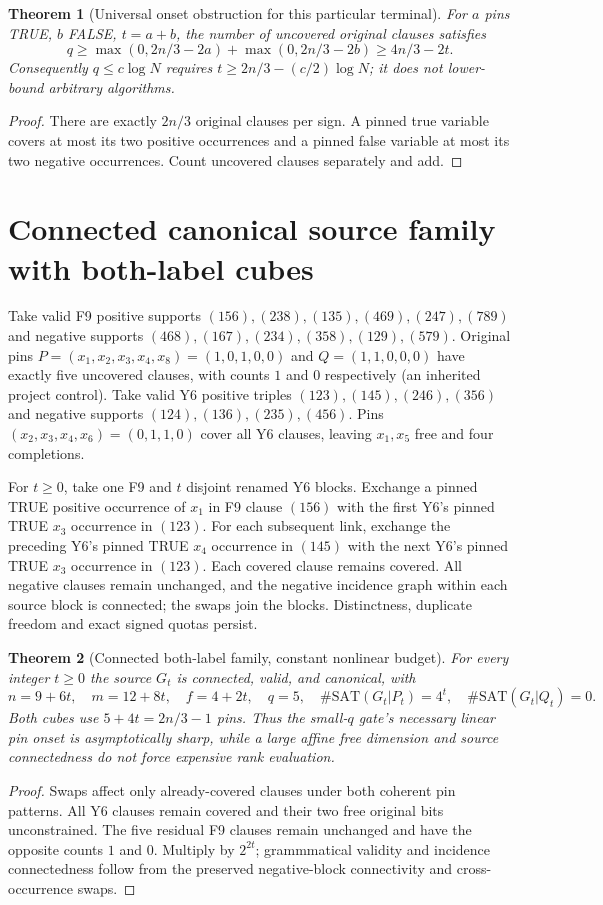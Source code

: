 \documentclass[11pt]{article}
\newtheorem{theorem}{Theorem}
\begin{document}
\begin{theorem}[Universal onset obstruction for this particular terminal]
For $a$ pins TRUE, $b$ FALSE, $t=a+b$, the number of uncovered original clauses satisfies
\[
\boxed{q\ge\max(0,2n/3-2a)+\max(0,2n/3-2b)\ge4n/3-2t.}
\tag{305.2}
\]
Consequently $q\le c\log N$ requires $t\ge2n/3-(c/2)\log N$; it does not lower-bound arbitrary algorithms.
\end{theorem}
\begin{proof}
There are exactly $2n/3$ original clauses per sign. A pinned true variable covers at most its two positive occurrences and a pinned false variable at most its two negative occurrences. Count uncovered clauses separately and add.
\end{proof}

\section{Connected canonical source family with both-label cubes}
Take valid F9 positive supports $(156),(238),(135),(469),(247),(789)$ and negative supports $(468),(167),(234),(358),(129),(579)$. Original pins $P=(x_1,x_2,x_3,x_4,x_8)=(1,0,1,0,0)$ and $Q=(1,1,0,0,0)$ have exactly five uncovered clauses, with counts $1$ and $0$ respectively (an inherited project control). Take valid Y6 positive triples $(123),(145),(246),(356)$ and negative supports $(124),(136),(235),(456)$. Pins $(x_2,x_3,x_4,x_6)=(0,1,1,0)$ cover all Y6 clauses, leaving $x_1,x_5$ free and four completions.

For $t\ge0$, take one F9 and $t$ disjoint renamed Y6 blocks. Exchange a pinned TRUE positive occurrence of $x_1$ in F9 clause $(156)$ with the first Y6's pinned TRUE $x_3$ occurrence in $(123)$. For each subsequent link, exchange the preceding Y6's pinned TRUE $x_4$ occurrence in $(145)$ with the next Y6's pinned TRUE $x_3$ occurrence in $(123)$. Each covered clause remains covered. All negative clauses remain unchanged, and the negative incidence graph within each source block is connected; the swaps join the blocks. Distinctness, duplicate freedom and exact signed quotas persist.
\begin{theorem}[Connected both-label family, constant nonlinear budget]
For every integer $t\ge0$ the source $G_t$ is connected, valid, and canonical, with
\[
n=9+6t,\quad m=12+8t,\quad f=4+2t,\quad q=5,\quad
\#\mathrm{SAT}(G_t|P_t)=4^t,\quad \#\mathrm{SAT}(G_t|Q_t)=0.
\tag{305.3}
\]
Both cubes use $5+4t=2n/3-1$ pins. Thus the small-$q$ gate's necessary linear pin onset is asymptotically sharp, while a large affine free dimension and source connectedness do not force expensive rank evaluation.
\end{theorem}
\begin{proof}
Swaps affect only already-covered clauses under both coherent pin patterns. All Y6 clauses remain covered and their two free original bits unconstrained. The five residual F9 clauses remain unchanged and have the opposite counts $1$ and $0$. Multiply by $2^{2t}$; grammmatical validity and incidence connectedness follow from the preserved negative-block connectivity and cross-occurrence swaps.
\end{proof}
\end{document}
